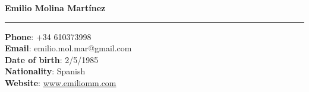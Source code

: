 \documentclass[letterpaper,11pt,oneside]{article}
\begin{document}

\centering \noindent  \LARGE{\textbf{Emilio Molina Martínez}}  \\
\noindent\rule{16cm}{0.4pt}
\normalsize


\begin{center}
\textbf{Phone}: +34 610373998\\
\textbf{Email}: emilio.mol.mar@gmail.com\\
\textbf{Date of birth}: 2/5/1985\\
\textbf{Nationality}: Spanish\\
\textbf{Website}: \url{www.emiliomm.com}\\
\end{center}

\vspace{1em}
\end{document}
